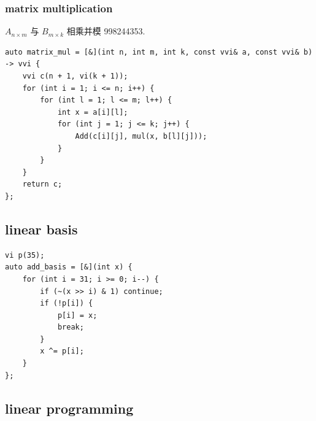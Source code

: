 \documentclass[UTF8, a4paper, titlepage, twoside]{ctexart}
\begin{document}
\subsubsection*{ matrix multiplication }
\(A_{n \times m}\) 与 \(B_{m \times k}\) 相乘并模 998244353.
\begin{lstlisting}[style=cpp]
auto matrix_mul = [&](int n, int m, int k, const vvi& a, const vvi& b) -> vvi {
    vvi c(n + 1, vi(k + 1));
    for (int i = 1; i <= n; i++) {
        for (int l = 1; l <= m; l++) {
            int x = a[i][l];
            for (int j = 1; j <= k; j++) {
                Add(c[i][j], mul(x, b[l][j]));
            }
        }
    }
    return c;
};
\end{lstlisting}

\subsection{ linear basis }
\begin{lstlisting}[style=cpp]
vi p(35);
auto add_basis = [&](int x) {
    for (int i = 31; i >= 0; i--) {
        if (~(x >> i) & 1) continue;
        if (!p[i]) {
            p[i] = x;
            break;
        }
        x ^= p[i];
    }
};
\end{lstlisting}

\subsection{ linear programming }

\newpage
\end{document}
